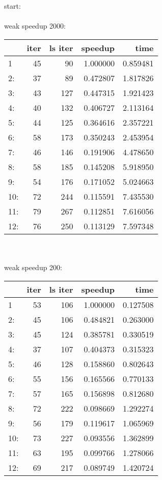 \documentclass[11pt,a4paper]{article}
\begin{document}
start:
\\ 
\\ 
 weak speedup 2000:
\\ 
\begin{tabular}{lrrrr}
\toprule
{} &  iter &  ls iter &   speedup &      time \\
\midrule
1   &    45 &       90 &  1.000000 &  0.859481 \\
2:  &    37 &       89 &  0.472807 &  1.817826 \\
3:  &    43 &      127 &  0.447315 &  1.921423 \\
4:  &    40 &      132 &  0.406727 &  2.113164 \\
5:  &    44 &      125 &  0.364616 &  2.357221 \\
6:  &    58 &      173 &  0.350243 &  2.453954 \\
7:  &    46 &      146 &  0.191906 &  4.478650 \\
8:  &    58 &      185 &  0.145208 &  5.918950 \\
9:  &    54 &      176 &  0.171052 &  5.024663 \\
10: &    72 &      244 &  0.115591 &  7.435530 \\
11: &    79 &      267 &  0.112851 &  7.616056 \\
12: &    76 &      250 &  0.113129 &  7.597348 \\
\bottomrule
\end{tabular}
\\ 
\\ 
 weak speedup 200:
\\ 
\begin{tabular}{lrrrr}
\toprule
{} &  iter &  ls iter &   speedup &      time \\
\midrule
1   &    53 &      106 &  1.000000 &  0.127508 \\
2:  &    45 &      106 &  0.484821 &  0.263000 \\
3:  &    45 &      124 &  0.385781 &  0.330519 \\
4:  &    37 &      107 &  0.404373 &  0.315323 \\
5:  &    46 &      128 &  0.158860 &  0.802643 \\
6:  &    55 &      156 &  0.165566 &  0.770133 \\
7:  &    57 &      165 &  0.156898 &  0.812680 \\
8:  &    72 &      222 &  0.098669 &  1.292274 \\
9:  &    56 &      179 &  0.119617 &  1.065969 \\
10: &    73 &      227 &  0.093556 &  1.362899 \\
11: &    63 &      195 &  0.099766 &  1.278066 \\
12: &    69 &      217 &  0.089749 &  1.420724 \\
\bottomrule
\end{tabular}
\end{document}
